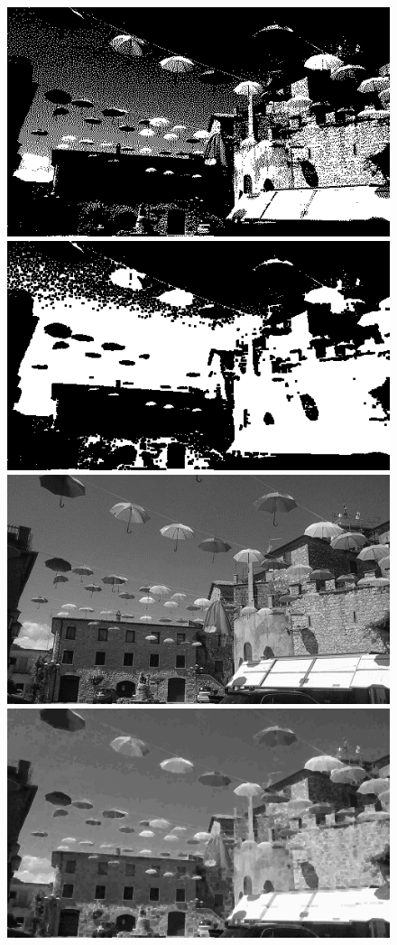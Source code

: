 \documentclass{article}
\begin{document}
	
  \begin{figure}[!ht]	
	\centering	
	\includegraphics[scale=1.2]{img/mono-obraz1}
	\includegraphics[scale=0.288]{img/morfologiczne/zamkniecie-mono}
	\includegraphics[scale=1.2]{img/gray-obraz1}
	\includegraphics[scale=0.288]{img/morfologiczne/zamkniecie-gray}

\end{figure}
\end{document}
